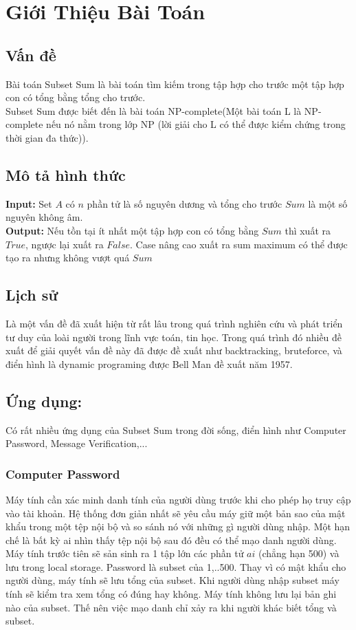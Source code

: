 \documentclass[a4paper]{article}
\begin{document}
\thispagestyle{empty}

\newpage
\tableofcontents
\newpage
\section{Giới Thiệu Bài Toán }
\subsection{Vấn đề}
Bài toán Subset Sum là bài toán tìm kiếm trong tập hợp cho trước một tập hợp con có tổng bằng tổng cho trước.\medskip \\
Subset Sum được biết đến là bài toán NP-complete(Một bài toán L là NP-complete nếu nó nằm trong lớp NP (lời giải cho L có thể được kiểm chứng trong thời gian đa thức)).
\subsection{Mô tả hình thức}
\textbf{Input:} Set $A$ có $n$ phần tử là số nguyên dương và tổng cho trước $Sum$ là một số nguyên không âm. \medskip \\
\textbf{Output:} Nếu tồn tại ít nhất một tập hợp con có tổng bằng $Sum$ thì xuất ra $True$, ngược lại xuất ra $False$. Case nâng cao xuất ra sum maximum có thể được tạo ra nhưng không vượt quá $Sum$
\subsection{Lịch sử}
Là một vấn đề đã xuất hiện từ rất lâu trong quá trình nghiên cứu và phát triển tư duy của loài người trong lĩnh vực toán, tin học. Trong quá trình đó nhiều đề xuất để giải quyết vấn đề này đã được đề xuất như backtracking, bruteforce, và điển hình là dynamic programing được Bell Man đề xuất năm 1957.
\subsection{Ứng dụng:}
Có rất nhiều ứng dụng của Subset Sum trong đời sống, điển hình như Computer Password, Message Verification,...
\subsubsection{Computer Password}
Máy tính cần xác minh danh tính của người dùng trước khi cho phép họ truy cập vào tài khoản.  Hệ thống đơn giản nhất sẽ yêu cầu máy giữ một bản sao của mật khẩu trong một tệp nội bộ và so sánh nó với những gì người dùng nhập.  Một hạn chế là bất kỳ ai nhìn thấy tệp nội bộ sau đó đều có thể mạo danh người dùng. Máy tính trước tiên sẽ sản sinh ra 1 tập lớn các phần tử $ai$ (chẳng hạn 500) và lưu trong local storage. Password là subset của {1,..500}. Thay vì có mật khẩu cho người dùng, máy tính sẽ lưu tổng của subset. Khi người dùng nhập subset máy tính sẽ kiểm tra xem tổng có đúng hay không. Máy tính không lưu lại bản ghi nào của subset. Thế nên việc mạo danh chỉ xảy ra khi người khác biết tổng và subset. 
\end{document}
